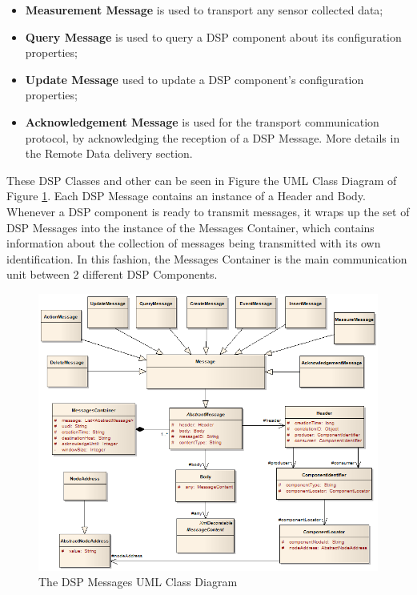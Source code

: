 \begin{itemize}
  \item \textbf{Measurement Message} is used to transport any sensor collected
  data;
  \item \textbf{Query Message} is used to query a DSP component about its
  configuration properties;
  \item \textbf{Update Message} used to update a DSP component's configuration
  properties;
  \item \textbf{Acknowledgement Message} is used for the transport communication
  protocol, by acknowledging the reception of a DSP Message. More details in the
  Remote Data delivery section.
\end{itemize}

These DSP Classes and other can be seen in Figure the  UML Class
Diagram \cite{uml} of Figure \ref{fig:DSP-Messages-Classes}. Each DSP Message
contains an instance of a Header and Body. Whenever a DSP component is ready
to transmit messages, it wraps up the set of DSP Messages into the instance of
the Messages Container, which contains information about the collection of
messages being transmitted with its own identification. In this fashion, the
Messages Container is the main communication unit between 2 different DSP
Components.

\begin{figure}[!t]
  \centering
  \includegraphics[scale=0.6]{../diagrams/DSP-Messages-Classes}
  \caption{The DSP Messages UML Class Diagram}
  \label{fig:DSP-Messages-Classes}
\end{figure}

